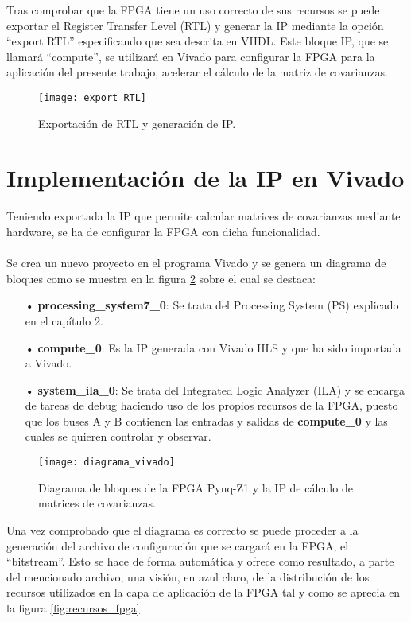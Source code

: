 Tras comprobar que la FPGA tiene un uso correcto de sus recursos se puede exportar el Register Transfer Level (RTL) y generar la IP mediante la opción ``export RTL'' especificando que sea descrita en VHDL. Este bloque IP, que se llamará ``compute'', se utilizará en Vivado para configurar la FPGA para la aplicación del presente trabajo, acelerar el cálculo de la matriz de covarianzas.

\begin{figure}[!htb]
\centering
\texttt{[image: export\_RTL]}
\caption{Exportación de RTL y generación de IP.}\label{fig:export_RTL}
\end{figure}

\section{Implementación de la IP en Vivado}
Teniendo exportada la IP que permite calcular matrices de covarianzas mediante hardware, se ha de configurar la FPGA con dicha funcionalidad.
\\
\\
Se crea un nuevo proyecto en el programa Vivado y se genera un diagrama de bloques como se muestra en la figura \ref{fig:diagrama_vivado} sobre el cual se destaca:
\begin{itemize}
\item[•] \textbf{processing\_system7\_0}: Se trata del Processing System (PS) explicado en el capítulo 2.
\item[•] \textbf{compute\_0}: Es la IP generada con Vivado HLS y que ha sido importada a Vivado.
\item[•] \textbf{system\_ila\_0}: Se trata del Integrated Logic Analyzer (ILA) y se encarga de tareas de debug haciendo uso de los propios recursos de la FPGA, puesto que los buses A y B contienen las entradas y salidas de \textbf{compute\_0} y las cuales se quieren controlar y observar.
\end{itemize}


\begin{figure}[!htb]
\centering
\texttt{[image: diagrama\_vivado]}
\caption{Diagrama de bloques de la FPGA Pynq-Z1 y la IP de cálculo de matrices de covarianzas.}\label{fig:diagrama_vivado}
\end{figure}

Una vez comprobado que el diagrama es correcto se puede proceder a la generación del archivo de configuración que se cargará en la FPGA, el ``bitstream''. Esto se hace de forma automática y ofrece como resultado, a parte del mencionado archivo, una visión, en azul claro, de la distribución de los recursos utilizados en la capa de aplicación de la FPGA tal y como se aprecia en la figura \ref{fig:recursos_fpga}

